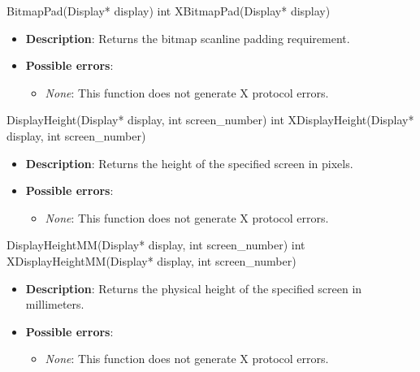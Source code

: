 \documentclass{report}
\begin{document}
\begin{itemize}
        \begin{cppcode}
            BitmapPad(Display* display)
            int XBitmapPad(Display* display)
        \end{cppcode}
        \begin{itemize}
            \item \textbf{Description}: Returns the bitmap scanline padding requirement.
            \item \textbf{Possible errors}:
                \begin{itemize}
                    \item \textit{None}: This function does not generate X protocol errors.
                \end{itemize}
        \end{itemize}

        \begin{cppcode}
            DisplayHeight(Display* display, int screen_number)
            int XDisplayHeight(Display* display, int screen_number)
        \end{cppcode}
        \begin{itemize}
            \item \textbf{Description}: Returns the height of the specified screen in pixels.
            \item \textbf{Possible errors}:
                \begin{itemize}
                    \item \textit{None}: This function does not generate X protocol errors.
                \end{itemize}
        \end{itemize}

        \begin{cppcode}
            DisplayHeightMM(Display* display, int screen_number)
            int XDisplayHeightMM(Display* display, int screen_number)
        \end{cppcode}
        \begin{itemize}
            \item \textbf{Description}: Returns the physical height of the specified screen in millimeters.
            \item \textbf{Possible errors}:
                \begin{itemize}
                    \item \textit{None}: This function does not generate X protocol errors.
                \end{itemize}
        \end{itemize}


\end{itemize}
\end{document}
